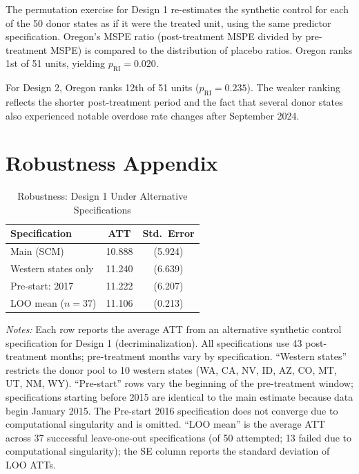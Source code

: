 \documentclass[12pt]{article}
\begin{document}
The permutation exercise for Design 1 re-estimates the synthetic control for each of the 50 donor states as if it were the treated unit, using the same predictor specification. Oregon's MSPE ratio (post-treatment MSPE divided by pre-treatment MSPE) is compared to the distribution of placebo ratios. Oregon ranks 1st of 51 units, yielding $p_{\text{RI}} = 0.020$.

For Design 2, Oregon ranks 12th of 51 units ($p_{\text{RI}} = 0.235$). The weaker ranking reflects the shorter post-treatment period and the fact that several donor states also experienced notable overdose rate changes after September 2024.


\section{Robustness Appendix}
\label{app:robustness}

\begin{table}[H]
\centering
\caption{Robustness: Design 1 Under Alternative Specifications}
\label{tab:robust}
\begin{threeparttable}
\begin{tabular}{lcc}
\toprule
Specification & ATT & Std.~Error \\
\midrule
Main (SCM) & 10.888 & (5.924) \\
Western states only & 11.240 & (6.639) \\
Pre-start: 2017 & 11.222 & (6.207) \\
LOO mean ($n=37$) & 11.106 & (0.213) \\
\bottomrule
\end{tabular}
\begin{tablenotes}[flushleft]
\small
\item \textit{Notes:} Each row reports the average ATT from an alternative synthetic control specification for Design 1 (decriminalization). All specifications use 43 post-treatment months; pre-treatment months vary by specification. ``Western states'' restricts the donor pool to 10 western states (WA, CA, NV, ID, AZ, CO, MT, UT, NM, WY). ``Pre-start'' rows vary the beginning of the pre-treatment window; specifications starting before 2015 are identical to the main estimate because data begin January 2015. The Pre-start 2016 specification does not converge due to computational singularity and is omitted. ``LOO mean'' is the average ATT across 37 successful leave-one-out specifications (of 50 attempted; 13 failed due to computational singularity); the SE column reports the standard deviation of LOO ATTs.
\end{tablenotes}
\end{threeparttable}
\end{table}
\end{document}
